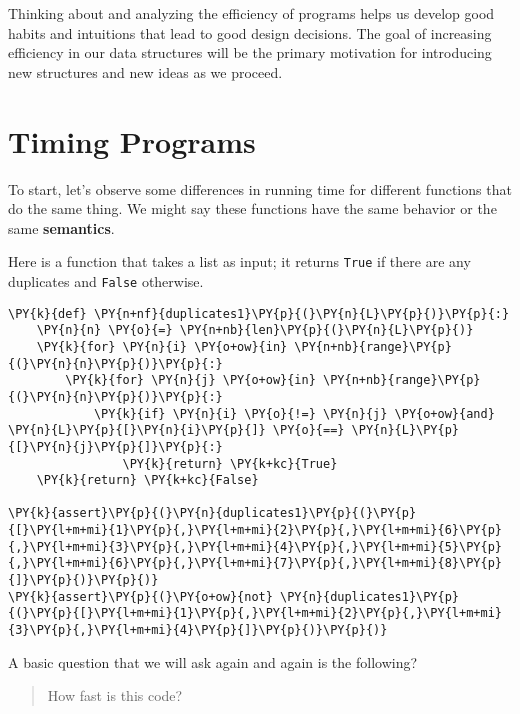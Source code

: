 Thinking about and analyzing the efficiency of programs helps us develop good habits and intuitions that lead to good design decisions.
The goal of increasing efficiency in our data structures will be the primary motivation for introducing new structures and new ideas
as we proceed.

\section{Timing Programs}


To start, let's observe some differences in running time for different functions that do the same thing.
We might say these functions have the same behavior or the same \textbf{semantics}.


Here is a function that takes a list as input; it returns \texttt{True} if there are any duplicates and \texttt{False} otherwise.

\begin{Verbatim}[commandchars=\\\{\}]
\PY{k}{def} \PY{n+nf}{duplicates1}\PY{p}{(}\PY{n}{L}\PY{p}{)}\PY{p}{:}
    \PY{n}{n} \PY{o}{=} \PY{n+nb}{len}\PY{p}{(}\PY{n}{L}\PY{p}{)}
    \PY{k}{for} \PY{n}{i} \PY{o+ow}{in} \PY{n+nb}{range}\PY{p}{(}\PY{n}{n}\PY{p}{)}\PY{p}{:}
        \PY{k}{for} \PY{n}{j} \PY{o+ow}{in} \PY{n+nb}{range}\PY{p}{(}\PY{n}{n}\PY{p}{)}\PY{p}{:}
            \PY{k}{if} \PY{n}{i} \PY{o}{!=} \PY{n}{j} \PY{o+ow}{and} \PY{n}{L}\PY{p}{[}\PY{n}{i}\PY{p}{]} \PY{o}{==} \PY{n}{L}\PY{p}{[}\PY{n}{j}\PY{p}{]}\PY{p}{:}
                \PY{k}{return} \PY{k+kc}{True}
    \PY{k}{return} \PY{k+kc}{False}

\PY{k}{assert}\PY{p}{(}\PY{n}{duplicates1}\PY{p}{(}\PY{p}{[}\PY{l+m+mi}{1}\PY{p}{,}\PY{l+m+mi}{2}\PY{p}{,}\PY{l+m+mi}{6}\PY{p}{,}\PY{l+m+mi}{3}\PY{p}{,}\PY{l+m+mi}{4}\PY{p}{,}\PY{l+m+mi}{5}\PY{p}{,}\PY{l+m+mi}{6}\PY{p}{,}\PY{l+m+mi}{7}\PY{p}{,}\PY{l+m+mi}{8}\PY{p}{]}\PY{p}{)}\PY{p}{)}
\PY{k}{assert}\PY{p}{(}\PY{o+ow}{not} \PY{n}{duplicates1}\PY{p}{(}\PY{p}{[}\PY{l+m+mi}{1}\PY{p}{,}\PY{l+m+mi}{2}\PY{p}{,}\PY{l+m+mi}{3}\PY{p}{,}\PY{l+m+mi}{4}\PY{p}{]}\PY{p}{)}\PY{p}{)}
\end{Verbatim}



A basic question that we will ask again and again is the following?

\begin{quote}

How fast is this code?

\end{quote}

